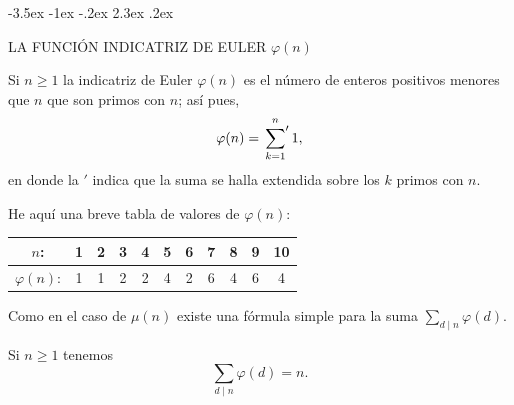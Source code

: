 \documentclass[12pt,a4paper]{book}
\makeatletter
\renewcommand\section{\@startsection{section}{1}{\z@}%
  {-3.5ex \@plus -1ex \@minus -.2ex}%
  {2.3ex \@plus .2ex}%
  {\normalfont\Large\bfseries\raggedright}}
\makeatother
\begin{document}
    \section{LA FUNCIÓN INDICATRIZ DE EULER \texorpdfstring{$\varphi(n)$}{φ(n)}}\label{sim:phi}
    \begin{definicion}
        Si $n\geq1$ la indicatriz de Euler $\varphi(n)$ es el número de enteros positivos
        menores que $n$ que son primos con $n$; así pues,
        \begin{equation*}
            \varphi(n)=\sideset{}{'}\sum_{k=1}^{n}1,
        \end{equation*}
        en donde la $'$ indica que la suma se halla extendida sobre los $k$ primos con $n$.
    \end{definicion}

    He aquí una breve tabla de valores de $\varphi(n)$:
    \begin{center}
        \begin{tabular}{c|cccccccccc}
            $n$: & 1 & 2 & 3 & 4 & 5 & 6 & 7 & 8 & 9 & 10\\
            \hline
            $\varphi(n)$: & 1 & 1 & 2 & 2 & 4 & 2 & 6 & 4 & 6 & 4
        \end{tabular}
    \end{center}

    Como en el caso de $\mu(n)$ existe una fórmula simple para la suma
    $\sum_{d\mid n}\varphi(d)$.

    \begin{teorema}
        Si $n\geq1$ tenemos
        \begin{equation*}
            \sum_{d\mid n}\varphi(d)=n.
        \end{equation*}
    \end{teorema}
\end{document}
